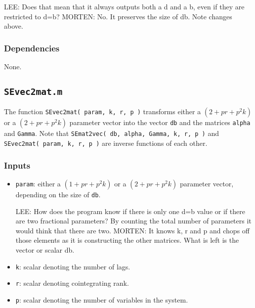 \documentclass[12pt]{article}
\begin{document}
LEE: Does that mean that it always outputs both a d and a b, even if they are restricted to d=b?
MORTEN: No. It preserves the size of db. Note changes above.

\subsubsection*{Dependencies}

None.




\newpage


\subsection{\texttt{SEvec2mat.m}}

The function \texttt{SEvec2mat( param, k, r, p )} transforms either a $( 2 + pr + p^2 k )$ or a $( 2 + pr + p^2 k )$ parameter vector into the vector \texttt{db} and the matrices \texttt{alpha} and \texttt{Gamma}. Note that \texttt{SEmat2vec( db, alpha, Gamma, k, r, p )} and \texttt{SEvec2mat( param, k, r, p )} are inverse functions of each other. 


\subsubsection*{Inputs}

\begin{itemize}

\item \texttt{param}: either a $( 1 + pr + p^2 k )$ or a $( 2 + pr + p^2 k )$ parameter vector, depending on the size of \texttt{db}. 

LEE: How does the program know if there is only one d=b value or if there are two fractional parameters? By counting the total number of parameters it would think that there are two.
MORTEN: It knows k, r and p and chops off those elements as it is constructing the other matrices. What is left is the vector or scalar db.

\item \texttt{k}: scalar denoting the number of lags.

\item \texttt{r}: scalar denoting cointegrating rank.

\item \texttt{p}: scalar denoting the number of variables in the system.
 
\end{itemize}
\end{document}

